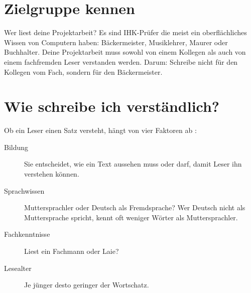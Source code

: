 \documentclass[a4paper,titlepage=true,twoside]{scrartcl}
\newcommand{\gquote}[1]{\glqq #1\grqq}
\begin{document}
% 
% 
% 


\section{Zielgruppe kennen}
Wer liest deine Projektarbeit? Es sind IHK-Prüfer die meist ein oberflächliches Wissen von
Computern haben: Bäckermeister, Musiklehrer, Maurer oder Buchhalter. 
Deine Projektarbeit muss sowohl von einem Kollegen als auch von einem fachfremden Leser
verstanden werden. Darum: Schreibe nicht für den Kollegen vom Fach, sondern für den Bäckermeister.


\section{Wie schreibe ich verständlich?}
Ob ein Leser einen Satz versteht, hängt von vier 
Faktoren ab \cite{bib.baumert}:

\begin{description}
 \item[Bildung] Sie entscheidet, wie ein Text aussehen muss oder darf, 
 damit Leser ihn verstehen können.
 \item[Sprachwissen] Muttersprachler oder Deutsch als Fremdsprache? 
Wer Deutsch nicht als Muttersprache spricht, kennt oft weniger Wörter als Muttersprachler.
 \item[Fachkenntnisse] Liest ein Fachmann oder Laie? 
 \item[Lesealter] Je jünger desto geringer der Wortschatz.
\end{description}
\end{document}
